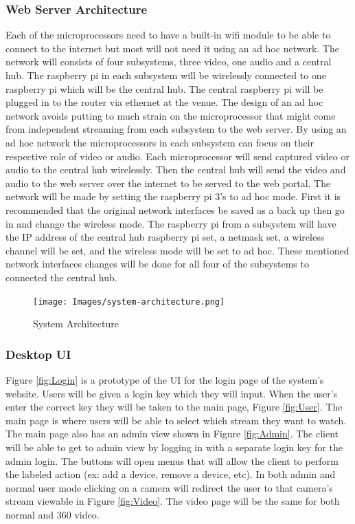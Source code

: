 \documentclass[onecolumn, draftclsnofoot,10pt, compsoc]{IEEEtran}
\begin{document}
        \subsubsection{Web Server Architecture}Each of the microprocessors need to have a built-in wifi module to be able to connect to the internet but most will not need it using an ad hoc network. 
        The network will consists of four subsystems, three video, one audio and a central hub. 
        The raspberry pi in each subsystem will be wirelessly connected to one raspberry pi which will be the central hub.
        The central raspberry pi will be plugged in to the router via ethernet at the venue. 
        The design of an ad hoc network avoids putting to much strain on the microprocessor that might come from independent streaming from each subsystem to the web server.
        By using an ad hoc network the microprocessors in each subsystem can focus on their respective role of video or audio. 
        Each microprocessor will send captured video or audio to the central hub wirelessly. 
        Then the central hub will send the video and audio to the web server over the internet to be served to the web portal.
        The network will be made by setting the raspberry pi 3’s to ad hoc mode. 
        First it is recommended that the original network interfaces be saved as a back up then go in and change the wireless mode. 
        The raspberry pi from a subsystem will have the IP address of the central hub raspberry pi set, a netmask set, a wireless channel will be set, and the wireless mode will be set to ad hoc. 
        These mentioned network interfaces changes will be done for all four of the subsystems to connected the central hub.

        \begin{figure}[H]
            \centering
            \captionsetup{justification=centering,margin=2cm}
            \texttt{[image: Images/system-architecture.png]}
            \centering\caption{System Architecture}
            \label{fig:Architecture}
        \end{figure}
        
        \subsubsection{Desktop UI}
        
        Figure \ref{fig:Login} is a prototype of the UI for the login page of the system's website. Users will be given a login key which they will input. When the user's enter the correct key they will be taken to the main page, Figure \ref{fig:User}. The main page is where users will be able to select which stream they want to watch. The main page also has an admin view shown in Figure \ref{fig:Admin}. The client will be able to get to admin view by logging in with a separate login key for the admin login. The buttons will open menus that will allow the client to perform the labeled action (ex: add a device, remove a device, etc). In both admin and normal user mode clicking on a camera will redirect the user to that camera's stream viewable in Figure \ref{fig:Video}. The video page will be the same for both normal and 360 video.
        
\end{document}
